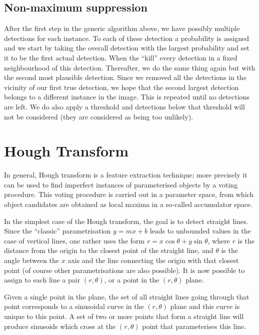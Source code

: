 \subsection*{Non-maximum suppression}
After the first step in the generic algorithm above, we have possibly multiple
detections for each instance. To each of these detection a probability is
assigned and we start by taking the overall detection with the largest
probability and set it to be the first actual detection. When the ``kill'' every
detection in a fixed neighbourhood of this detection. Thereafter, we do the same
thing again but with the second most plausible detection. Since we removed all
the detections in the vicinity of our first true detection, we hope that the
second largest detection belongs to a different instance in the image. This is
repeated until no detections are left. We do also apply a threshold and
detections below that threshold will not be considered (they are considered as
being too unlikely).

\section{Hough Transform}
In general, Hough transform is a feature extraction technique; more precisely it
can be used to find imperfect instances of parameterised objects by a voting
procedure. This voting procedure is carried out in a parameter space, from which
object candidates are obtained as local maxima in a so-called accumulator space.

In the simplest case of the Hough transform, the goal is to detect straight
lines. Since the ``classic'' parametrisation $y = mx + b$ leads to unbounded
values in the case of vertical lines, one rather uses the form
$r = x \cos \theta + y \sin \theta$, where $r$ is the distance from the origin
to the closest point of the straight line, and $\theta$ is the angle between the
$x$ axis and the line connecting the origin with that closest point (of course
other parametrisations are also possible). It is now possible to assign to each
line a pair $(r,\theta)$, or a point in the $(r,\theta)$ plane.

Given a single point in the plane, the set of all straight lines going through
that point corresponds to a sinusoidal curve in the $(r,\theta)$ plane and this
curve is unique to this point. A set of two or more points that form a straight
line will produce sinusoids which cross at the $(r,\theta)$ point that
parameterises this line.

